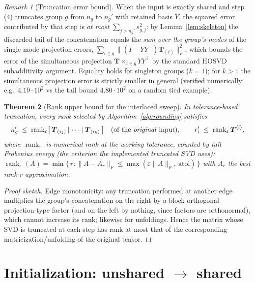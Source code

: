 \documentclass[11pt]{article}
\newtheorem{theorem}{Theorem}[section]
\theoremstyle{definition}
\theoremstyle{remark}
\newtheorem{remark}[theorem]{Remark}
\newcommand{\T}{\boldsymbol{T}}
\newcommand{\rank}{\operatorname{rank}}
\begin{document}
\begin{remark}[Truncation error bound]
When the input is exactly shared and step (4) truncates group $g$ from
$n_g$ to $n_g'$ with retained basis $Y$, the squared error contributed by
that step is \emph{at most} $\sum_{j > n_g'} s_{g,j}^2$: by
Lemma~\ref{lem:skeleton} the discarded tail of the concatenation equals the
\emph{sum over the group's modes} of the single-mode projection errors,
$\sum_{i \in g} \|(I - YY^\top)\T_{(i)}\|_F^2$, which bounds the error of the
simultaneous projection $\T \times_{i \in g} YY^\top$ by the standard
HOSVD subadditivity argument. Equality holds for singleton groups ($k=1$);
for $k > 1$ the simultaneous projection error is strictly smaller in general
(verified numerically: e.g.\ $4.19\cdot10^2$ vs the tail bound
$4.80\cdot10^2$ on a random tied example).
\end{remark}

\begin{theorem}[Rank upper bound for the interlaced sweep]\label{thm:rankbound}
In tolerance-based truncation, every rank selected by
Algorithm~\ref{alg:rounding} satisfies
\[
n_g' \;\leq\; \rank_\varepsilon
\bigl[\,\T_{(i_1)} \,|\, \cdots \,|\, \T_{(i_k)}\,\bigr]
\quad\text{(of the \emph{original} input)},
\qquad
r_i' \;\leq\; \rank_\varepsilon \T^{\langle i \rangle},
\]
where $\rank_\varepsilon$ is numerical rank at the working tolerance,
counted by tail Frobenius energy (the criterion the implemented truncated SVD
uses): $\rank_\varepsilon(A) = \min\{\, r :
\|A - A_r\|_F \le \max(\varepsilon \|A\|_F,\ \mathrm{atol}) \,\}$ with $A_r$
the best rank-$r$ approximation.
\end{theorem}

\begin{proof}[Proof sketch]
Edge monotonicity: any truncation performed at another edge multiplies the
group's concatenation on the right by a block-orthogonal-projection-type
factor (and on the left by nothing, since factors are orthonormal), which
cannot increase its rank; likewise for unfoldings. Hence the matrix whose SVD
is truncated at each step has rank at most that of the corresponding
matricization/unfolding of the original tensor.
\end{proof}

\section{Initialization: unshared $\to$ shared}\label{sec:init}
\end{document}
